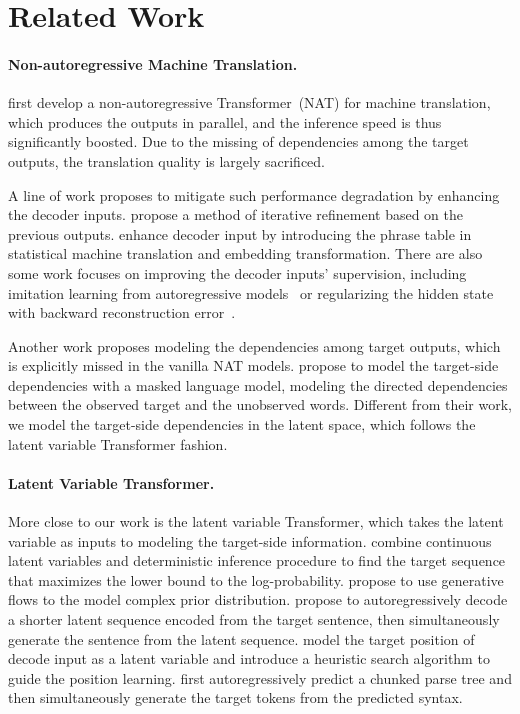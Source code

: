 \section{Related Work}
\paragraph{Non-autoregressive Machine Translation.}
\citet{nat} first develop a non-autoregressive Transformer~(NAT) for machine translation, which produces the outputs in parallel, and the inference speed is thus significantly boosted. 
Due to the missing of dependencies among the target outputs, the translation quality is largely sacrificed.

A line of work proposes to mitigate such performance degradation by enhancing the decoder inputs.  
\citet{iter_nat} propose a method of iterative refinement based on the previous outputs. 
\citet{enat} enhance decoder input by introducing the phrase table in statistical machine translation and embedding transformation. 
There are also some work focuses on improving the decoder inputs' supervision, including imitation learning from autoregressive models~\citep{imitate_nat} or regularizing the hidden state with backward reconstruction error~\citep{nat_reg}. 

Another work proposes modeling the dependencies among target outputs, which is explicitly missed in the vanilla NAT models. 
\citet{glat,cmlm} propose to model the target-side dependencies with a masked language model, modeling the directed dependencies between the observed target and the unobserved words. 
Different from their work, we model the target-side dependencies in the latent space, which follows the latent variable Transformer fashion.

\paragraph{Latent Variable Transformer.} 
More close to our work is the latent variable Transformer, which takes the latent variable as inputs to modeling the target-side information. 
\citet{lv_nar} combine continuous latent variables and deterministic inference procedure to find the target sequence that maximizes the lower bound to the log-probability. 
\citet{flowseq} propose to use generative flows to the model complex prior distribution. 
\citet{lt} propose to autoregressively decode a shorter latent sequence encoded from the target sentence, then simultaneously generate the sentence from the latent sequence. 
\citet{pnat} model the target position of decode input as a latent variable and introduce a heuristic search algorithm to guide the position learning. 
\citet{syn_st} first autoregressively predict a chunked parse tree and then simultaneously generate the target tokens from the predicted syntax.

